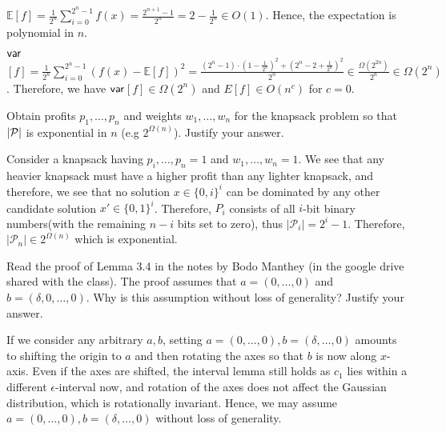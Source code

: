 \documentclass[solution,addpoints,12pt]{exam}
\begin{document}
\begin{questions}
\begin{solution}
$\mathbb{E}[f] = \frac{1}{2^n}\sum_{i=0}^{2^n-1} f(x) = \frac{2^{n+1}-1}{2^n} = 2-\frac{1}{2^n} \in O(1)$. Hence, the expectation is polynomial in $n$.

$\sf var$$[f]=\frac{1}{2^n}\sum_{i=0}^{2^n-1}{(f(x)-\mathbb{E}[f])}^2 = \frac{(2^n-1)\cdot{(1-\frac{1}{2^n})}^2 + {(2^n-2+\frac{1}{2^n})}^2}{2^n} \in \frac{\Omega(2^{2n})}{2^n} \in \Omega(2^n)$. Therefore, we have $\sf var$$[f]\in \Omega(2^n)$ and $E[f] \in O(n^c)$ for $c = 0$. 
\end{solution}


\question[7] Obtain profits $p_1,\ldots, p_n$ and weights $w_1,\ldots, w_n$ for the knapsack problem so that $|{\cal P}|$ is exponential in $n$ (e.g $2^{\Omega(n)}$). Justify your answer.   
\begin{solution}
Consider a knapsack having $p_i,\ldots, p_n=1$ and $w_1,\ldots,w_n = 1$. We see that any heavier knapsack must have a higher profit than any lighter knapsack, and therefore, we see that no solution $x \in {\{0,i\}}^i$ can be dominated by any other candidate solution $x' \in {\{0,1\}}^i$. Therefore, $P_i$ consists of all $i$-bit binary numbers(with the remaining $n-i$ bits set to zero), thus $|\mathcal{P}_i| = 2^i-1$. Therefore, $|\mathcal{P}_n| \in 2^{\Omega(n)}$ which is exponential.  
\end{solution}
\question[6] Read the proof of Lemma 3.4 in the notes by Bodo Manthey (in the google drive shared with the class). The proof assumes that $a=(0,\ldots, 0)$ and $b=(\delta, 0,\ldots, 0)$. Why is this assumption without loss of generality? Justify your answer.
\begin{solution}
If we consider any arbitrary $a,b$, setting $a = (0,\dots,0), b = (\delta,\ldots,0)$ amounts to shifting the origin to $a$ and then rotating the axes so that $b$ is now along $x$-axis. Even if the axes are shifted, the interval lemma still holds as $c_1$ lies within a different $\epsilon$-interval now, and rotation of the axes does not affect the Gaussian distribution, which is rotationally invariant. Hence, we may assume $a=(0,\ldots,0), b = (\delta,\ldots,0)$ without loss of generality. 
\end{solution}
\end{questions}
\end{document}
